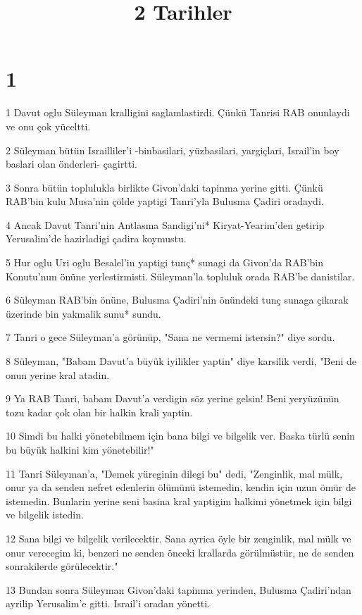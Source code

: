 

\title{2 Tarihler}


\chapter{1}

\par 1 Davut oglu Süleyman kralligini saglamlastirdi. Çünkü Tanrisi RAB onunlaydi ve onu çok yüceltti.
\par 2 Süleyman bütün Israilliler'i -binbasilari, yüzbasilari, yargiçlari, Israil'in boy baslari olan önderleri- çagirtti.
\par 3 Sonra bütün toplulukla birlikte Givon'daki tapinma yerine gitti. Çünkü RAB'bin kulu Musa'nin çölde yaptigi Tanri'yla Bulusma Çadiri oradaydi.
\par 4 Ancak Davut Tanri'nin Antlasma Sandigi'ni* Kiryat-Yearim'den getirip Yerusalim'de hazirladigi çadira koymustu.
\par 5 Hur oglu Uri oglu Besalel'in yaptigi tunç* sunagi da Givon'da RAB'bin Konutu'nun önüne yerlestirmisti. Süleyman'la topluluk orada RAB'be danistilar.
\par 6 Süleyman RAB'bin önüne, Bulusma Çadiri'nin önündeki tunç sunaga çikarak üzerinde bin yakmalik sunu* sundu.
\par 7 Tanri o gece Süleyman'a görünüp, "Sana ne vermemi istersin?" diye sordu.
\par 8 Süleyman, "Babam Davut'a büyük iyilikler yaptin" diye karsilik verdi, "Beni de onun yerine kral atadin.
\par 9 Ya RAB Tanri, babam Davut'a verdigin söz yerine gelsin! Beni yeryüzünün tozu kadar çok olan bir halkin krali yaptin.
\par 10 Simdi bu halki yönetebilmem için bana bilgi ve bilgelik ver. Baska türlü senin bu büyük halkini kim yönetebilir!"
\par 11 Tanri Süleyman'a, "Demek yüreginin dilegi bu" dedi, "Zenginlik, mal mülk, onur ya da senden nefret edenlerin ölümünü istemedin, kendin için uzun ömür de istemedin. Bunlarin yerine seni basina kral yaptigim halkimi yönetmek için bilgi ve bilgelik istedin.
\par 12 Sana bilgi ve bilgelik verilecektir. Sana ayrica öyle bir zenginlik, mal mülk ve onur verecegim ki, benzeri ne senden önceki krallarda görülmüstür, ne de senden sonrakilerde görülecektir."
\par 13 Bundan sonra Süleyman Givon'daki tapinma yerinden, Bulusma Çadiri'ndan ayrilip Yerusalim'e gitti. Israil'i oradan yönetti.
